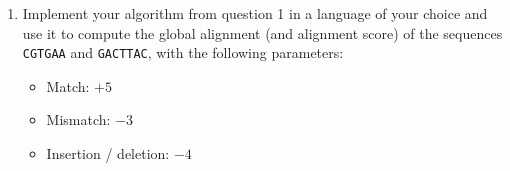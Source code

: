 \documentclass[10pt,\jkfside,a4paper]{article}
\begin{document}
\begin{enumerate}
\begin{lstlisting}[language=python, mathescape=true]
    for j in range(1, len(w)):
        mem[0, j] = mem[0, j - 1] - S["_", w[j - 1]]
        ptr[0, j] = "$\leftarrow$"

    for i in range(1, len(v) + 1):
        for j in range(1, len(w) + 1):
            mem[i][j] = max(
                mem[i - 1][j - 1] + score[v[i - 1], w[j - 1]],
                mem[i - 1][j] + score["_", w[j - 1]],
                mem[i][j - 1] + score["_", v[i - 1]],
            )
            match mem[i][j]:
                case mem[i - 1][j - 1] + S[v[i], w[j]]:
                    ptr[i][j] = "$\nwarrow$"
                case mem[i - 1][j] - S[\_, v[i - 1]]:
                    ptr[i][j] = "$\uparrow$"
                case mem[i][j - 1] - S[\_, w[j - 1]]:
                    ptr[i][j] = "$\leftarrow$"

    return mem, ptr

    \end{lstlisting}

    A matrix which would convert this problem into LCS is given below:
    \[
        \begin{pmatrix}
            1 & -\infty & \cdots & -\infty& 0 \\
            -\infty& 1 & \cdots & -\infty& 0 \\
            -\infty& -\infty& \cdots & -\infty& 0 \\
            \vdots & \vdots & \vdots & \vdots & \vdots \\
            -\infty& -\infty& \cdots & 1 & 0 \\
            0 & 0 & \cdots & 0 & 0 \\
        \end{pmatrix}
    \]

    \item Implement your algorithm from question 1 in a language of your choice and use it to compute the global alignment (and alignment score) of the sequences \texttt{CGTGAA} and \texttt{GACTTAC}, with the
    following parameters:

    \begin{itemize}

        \item Match: $+5$

        \item Mismatch: $-3$

        \item Insertion / deletion: $-4$

    \end{itemize}


\end{enumerate}
\end{document}
